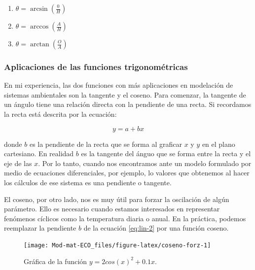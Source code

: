 \documentclass[
]{book}
\providecommand{\tightlist}{%
  \setlength{\itemsep}{0pt}\setlength{\parskip}{0pt}}
\begin{document}
\begin{enumerate}
\def\labelenumi{\arabic{enumi}.}
\tightlist
\item
  \(\theta = \arcsin \left(\frac{0}{H}\right)\)
\item
  \(\theta = \arccos \left(\frac{A}{H}\right)\)
\item
  \(\theta = \arctan \left(\frac{O}{A} \right)\)
\end{enumerate}

\hypertarget{aplicaciones-de-las-funciones-trigonomuxe9tricas}{%
\subsubsection{Aplicaciones de las funciones trigonométricas}\label{aplicaciones-de-las-funciones-trigonomuxe9tricas}}

En mi experiencia, las dos funciones con más aplicaciones en modelación de sistemas ambientales son la tangente y el coseno. Para comenzar, la tangente de un ángulo tiene una relación directa con la pendiente de una recta. Si recordamos la recta está descrita por la ecuación:

\begin{equation}
    y = a + bx \label{eq:lin-2}
\end{equation}

donde \(b\) es la pendiente de la recta que se forma al graficar \(x\) y \(y\) en el plano cartesiano. En realidad \(b\) es la tangente del ánguo que se forma entre la recta y el eje de las \(x\). Por lo tanto, cuando nos encontramos ante un modelo formulado por medio de ecuaciones diferenciales, por ejemplo, lo valores que obtenemos al hacer los cálculos de ese sistema es una pendiente o tangente.

El coseno, por otro lado, nos es muy útil para forzar la oscilación de algún parámetro. Ello es necesario cuando estamos interesados en representar fenómenos cíclicos como la temperatura diaria o anual. En la práctica, podemos reemplazar la pendiente \(b\) de la ecuación \eqref{eq:lin-2} por una función coseno.

\begin{figure}

{\centering \texttt{[image: Mod-mat-ECO\_files/figure-latex/coseno-forz-1]} 

}

\caption{Gráfica de la función $y = 2 cos(x)^2 + 0.1  x$.}\label{fig:coseno-forz}
\end{figure}
\end{document}
